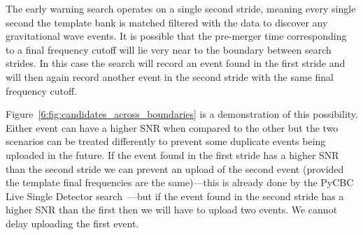 The early warning search operates on a single second stride, meaning every single second the template bank is matched filtered with the data to discover any gravitational wave events. It is possible that the pre-merger time corresponding to a final frequency cutoff will lie very near to the boundary between search strides. In this case the search will record an event found in the first stride and will then again record another event in the second stride with the same final frequency cutoff.

Figure~\ref{6:fig:candidates_across_boundaries} is a demonstration of this possibility. Either event can have a higher SNR when compared to the other but the two scenarios can be treated differently to prevent some duplicate events being uploaded in the future. If the event found in the first stride has a higher SNR than the second stride we can prevent an upload of the second event (provided the template final frequencies are the same)---this is already done by the PyCBC Live Single Detector search~\cite{PyCBC_singles:2022}---but if the event found in the second stride has a higher SNR than the first then we will have to upload two events. We cannot delay uploading the first event.




